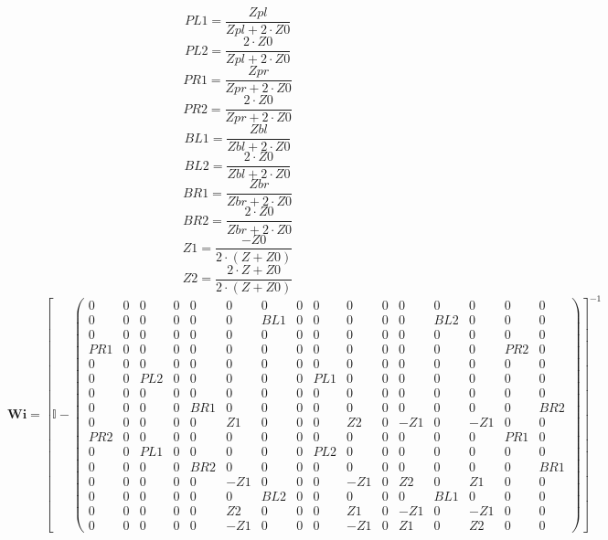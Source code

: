 \[ PL1=\frac{Zpl}{Zpl+2\cdot Z0} \]
\[ PL2=\frac{2\cdot Z0}{Zpl+2\cdot Z0} \]
\[ PR1=\frac{Zpr}{Zpr+2\cdot Z0} \]
\[ PR2=\frac{2\cdot Z0}{Zpr+2\cdot Z0} \]
\[ BL1=\frac{Zbl}{Zbl+2\cdot Z0} \]
\[ BL2=\frac{2\cdot Z0}{Zbl+2\cdot Z0} \]
\[ BR1=\frac{Zbr}{Zbr+2\cdot Z0} \]
\[ BR2=\frac{2\cdot Z0}{Zbr+2\cdot Z0} \]
\[ Z1=\frac{-Z0}{2\cdot \left(Z+Z0\right)} \]
\[ Z2=\frac{2\cdot Z+Z0}{2\cdot \left(Z+Z0\right)} \]
\[ \mathbf{Wi} =  \left[ \mathbb{I}  - \left(\begin{smallmatrix} 0 & 0
& 0 & 0 & 0 & 0 & 0 & 0 & 0 & 0 & 0 & 0 & 0 & 0 & 0 & 0 \\ 0 & 0 & 0 &
0 & 0 & 0 & BL1 & 0 & 0 & 0 & 0 & 0 & BL2 & 0 & 0 & 0 \\ 0 & 0 & 0 & 0
& 0 & 0 & 0 & 0 & 0 & 0 & 0 & 0 & 0 & 0 & 0 & 0 \\ PR1 & 0 & 0 & 0 & 0
& 0 & 0 & 0 & 0 & 0 & 0 & 0 & 0 & 0 & PR2 & 0 \\ 0 & 0 & 0 & 0 & 0 & 0
& 0 & 0 & 0 & 0 & 0 & 0 & 0 & 0 & 0 & 0 \\ 0 & 0 & PL2 & 0 & 0 & 0 & 0
& 0 & PL1 & 0 & 0 & 0 & 0 & 0 & 0 & 0 \\ 0 & 0 & 0 & 0 & 0 & 0 & 0 & 0
& 0 & 0 & 0 & 0 & 0 & 0 & 0 & 0 \\ 0 & 0 & 0 & 0 & BR1 & 0 & 0 & 0 & 0
& 0 & 0 & 0 & 0 & 0 & 0 & BR2 \\ 0 & 0 & 0 & 0 & 0 & Z1 & 0 & 0 & 0 &
Z2 & 0 & -Z1 & 0 & -Z1 & 0 & 0 \\ PR2 & 0 & 0 & 0 & 0 & 0 & 0 & 0 & 0
& 0 & 0 & 0 & 0 & 0 & PR1 & 0 \\ 0 & 0 & PL1 & 0 & 0 & 0 & 0 & 0 & PL2
& 0 & 0 & 0 & 0 & 0 & 0 & 0 \\ 0 & 0 & 0 & 0 & BR2 & 0 & 0 & 0 & 0 & 0
& 0 & 0 & 0 & 0 & 0 & BR1 \\ 0 & 0 & 0 & 0 & 0 & -Z1 & 0 & 0 & 0 & -Z1
& 0 & Z2 & 0 & Z1 & 0 & 0 \\ 0 & 0 & 0 & 0 & 0 & 0 & BL2 & 0 & 0 & 0 &
0 & 0 & BL1 & 0 & 0 & 0 \\ 0 & 0 & 0 & 0 & 0 & Z2 & 0 & 0 & 0 & Z1 & 0
& -Z1 & 0 & -Z1 & 0 & 0 \\ 0 & 0 & 0 & 0 & 0 & -Z1 & 0 & 0 & 0 & -Z1 &
0 & Z1 & 0 & Z2 & 0 & 0 \end{smallmatrix}\right) \right]^{-1}  \]
